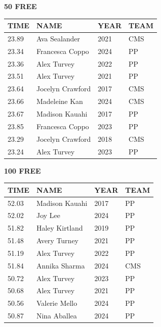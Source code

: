 \begin{table}[H]
\centering
\begin{minipage}[t]{0.48\textwidth}
\centering
\textbf{50 FREE}\\[0.1cm]
\begin{tabular}{@{}p{1.8cm}p{2.8cm}p{1.2cm}p{1.4cm}@{}}
\hline
    \textbf{TIME} & \textbf{NAME} & \textbf{YEAR} & \textbf{TEAM} \\
\hline
    23.89 & Ava Sealander & 2021 & CMS \\
    23.34 & Francesca Coppo & 2024 & PP \\
    23.36 & Alex Turvey & 2022 & PP \\
    23.51 & Alex Turvey & 2021 & PP \\
    23.64 & Jocelyn Crawford & 2017 & CMS \\
    23.66 & Madeleine Kan & 2024 & CMS \\
    23.67 & Madison Kauahi & 2017 & PP \\
    23.85 & Francesca Coppo & 2023 & PP \\
    23.29 & Jocelyn Crawford & 2018 & CMS \\
    23.24 & Alex Turvey & 2023 & PP \\
\hline
\end{tabular}
\end{minipage}\hfill
\begin{minipage}[t]{0.48\textwidth}
\centering
\textbf{100 FREE}\\[0.1cm]
\begin{tabular}{@{}p{1.8cm}p{2.8cm}p{1.2cm}p{1.4cm}@{}}
\hline
    \textbf{TIME} & \textbf{NAME} & \textbf{YEAR} & \textbf{TEAM} \\
\hline
    52.03 & Madison Kauahi & 2017 & PP \\
    52.02 & Joy Lee & 2024 & PP \\
    51.82 & Haley Kirtland & 2019 & PP \\
    51.48 & Avery Turney & 2021 & PP \\
    51.19 & Alex Turvey & 2022 & PP \\
    51.84 & Annika Sharma & 2024 & CMS \\
    50.72 & Alex Turvey & 2023 & PP \\
    50.68 & Alex Turvey & 2021 & PP \\
    50.56 & Valerie Mello & 2024 & PP \\
    50.87 & Nina Aballea & 2024 & PP \\
\hline
\end{tabular}
\end{minipage}
\end{table}

